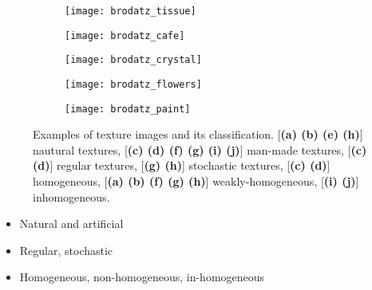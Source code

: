 \begin{figure}[!ht]
    \begin{subfigure}[b]{0.19\textwidth}
        \texttt{[image: brodatz\_tissue]}
        \caption{}
    \end{subfigure}
    \begin{subfigure}[b]{0.19\textwidth}
        \texttt{[image: brodatz\_cafe]}
        \caption{}
    \end{subfigure} 
    \begin{subfigure}[b]{0.19\textwidth}
        \texttt{[image: brodatz\_crystal]}
        \caption{}
    \end{subfigure}
    \begin{subfigure}[b]{0.19\textwidth}
        \texttt{[image: brodatz\_flowers]}
        \caption{}
    \end{subfigure}
    \begin{subfigure}[b]{0.19\textwidth}
        \texttt{[image: brodatz\_paint]}
        \caption{}
    \end{subfigure}    
                  
    \caption{ Examples of texture images and its classification. [{\small \textsf{\textbf{(a) (b) (e) (h)}}}] nautural textures, [{\small \textsf{\textbf{(c) (d) (f) (g) (i) (j)}}}] man-made textures, [{\small \textsf{\textbf{(c) (d)}}}] regular textures, [{\small \textsf{\textbf{(g) (h)}}}] stochastic textures, [{\small \textsf{\textbf{(c) (d)}}}] homogeneous, [{\small \textsf{\textbf{(a) (b) (f) (g) (h)}}}] weakly-homogeneous, [{\small \textsf{\textbf{(i) (j)}}}] inhomogeneous.}\label{fig:texture_images}    
\end{figure}


\begin{itemize}
	\item Natural and artificial 
	\item Regular, stochastic
	\item Homogeneous, non-homogeneous, in-homogeneous
\end{itemize}



